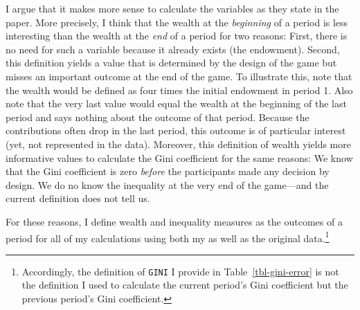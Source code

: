 \documentclass[
  authoryear,
  preprint,
  3p]{elsarticle}
\begin{document}
I argue that it makes more sense to calculate the variables as they
state in the paper. More precisely, I think that the wealth at the
\emph{beginning} of a period is less interesting than the wealth at the
\emph{end} of a period for two reasons: First, there is no need for such
a variable because it already exists (the endowment). Second, this
definition yields a value that is determined by the design of the game
but misses an important outcome at the end of the game. To illustrate
this, note that the wealth would be defined as four times the initial
endowment in period 1. Also note that the very last value would equal
the wealth at the beginning of the last period and says nothing about
the outcome of that period. Because the contributions often drop in the
last period, this outcome is of particular interest (yet, not
represented in the data). Moreover, this definition of wealth yields
more informative values to calculate the Gini coefficient for the same
reasons: We know that the Gini coefficient is zero \emph{before} the
participants made any decision by design. We do no know the inequality
at the very end of the game---and the current definition does not tell
us.

For these reasons, I define wealth and inequality measures as the
outcomes of a period for all of my calculations using both my as well as
the original data.\footnote{Accordingly, the definition of \texttt{GINI}
  I provide in Table~\ref{tbl-gini-error} is not the definition I used
  to calculate the current period's Gini coefficient but the previous
  period's Gini coefficient.}

\newpage{}


  
\end{document}
